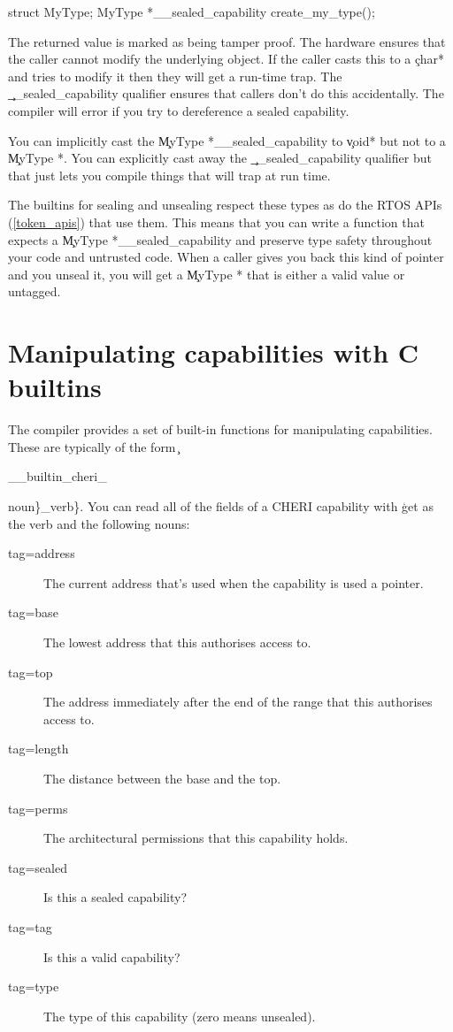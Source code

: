 {{{{{{\begin{cxxsnippet}
struct MyType;
MyType *__sealed_capability create_my_type();
\end{cxxsnippet}

The returned value is marked as being tamper proof.
The hardware ensures that the caller cannot modify the underlying object.
If the caller casts this to a \c{char*} and tries to modify it then they will get a run-time trap.
The \c{__sealed_capability} qualifier ensures that callers don't do this accidentally.
The compiler will error if you try to dereference a sealed capability.

You can implicitly cast the \c{MyType *__sealed_capability} to \c{void*} but not to a \c{MyType *}.
You can explicitly cast away the \c{__sealed_capability} qualifier but that just lets you compile things that will trap at run time.

The builtins for sealing and unsealing respect these types as do the RTOS APIs (\ref{token_apis}) that use them.
This means that you can write a function that expects a \c{MyType *__sealed_capability} and preserve type safety throughout your code and untrusted code.
When a caller gives you back this kind of pointer and you unseal it, you will get a \c{MyType *} that is either a valid value or untagged.

\section{Manipulating capabilities with C builtins}

The compiler provides a set of built-in functions for manipulating capabilities.
These are typically of the form \c{__builtin_cheri_{noun\}_{verb\}}.
You can read all of the fields of a CHERI capability with \c{get} as the verb and the following nouns:

\begin{description}
	\item[tag=address]{The current address that's used when the capability is used a pointer.}
	\item[tag=base]{The lowest address that this authorises access to.}
	\item[tag=top]{The address immediately after the end of the range that this authorises access to.}
	\item[tag=length]{The distance between the base and the top.}
	\item[tag=perms]{The architectural permissions that this capability holds.}
	\item[tag=sealed]{Is this a sealed capability?}
	\item[tag=tag]{Is this a valid capability?}
	\item[tag=type]{The type of this capability (zero means unsealed).}
\end{description}

}}}}}}}}
